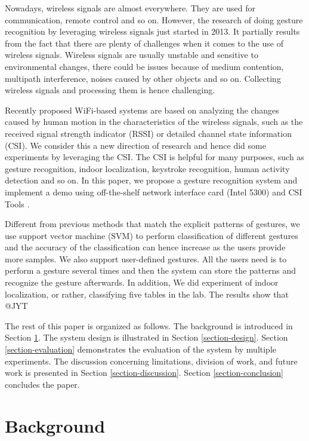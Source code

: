 \documentclass[conference]{IEEEtran}
\begin{document}
Nowadays, wireless signals are almost everywhere. They are used for communication, remote control and so on. However, the research of doing gesture recognition by leveraging wireless signals just started in 2013. It partially results from the fact that there are plenty of challenges when it comes to the use of wireless signals. 
Wireless signals are usually unstable and sensitive to environmental changes, there could be issues because of medium contention, multipath interference, noises caused by other objects and so on.
Collecting wireless signals and processing them is hence challenging.

Recently proposed WiFi-based systems are based on analyzing the changes caused by human motion in the characteristics of the wireless signals, such as the received signal strength indicator (RSSI) or detailed channel state information (CSI).
We consider this a new direction of research and hence did some experiments by leveraging the CSI.
The CSI is helpful for many purposes, such as gesture recognition, indoor localization, keystroke recognition, human activity detection and so on.
In this paper, we propose a gesture recognition system and implement a demo using off-the-shelf network interface card (Intel 5300) and CSI Tools \cite{halperin2011tool}. 

Different from previous methods that match the explicit patterns of gestures, we use support vector machine (SVM) to perform classification of different gestures and the accuracy of the classification can hence increase as the users provide more samples.
We also support user-defined gestures. All the users need is to perform a gesture several times and then the system can store the patterns and recognize the gesture afterwards.
In addition, We did experiment of indoor localization, or rather, classifying five tables in the lab.
The results show that @JYT

The rest of this paper is organized as follows.  The background is introduced in Section \ref{section-background}. The system design is illustrated in Section \ref{section-design}. Section \ref{section-evaluation} demonstrates the evaluation of the system by multiple experiments. The discussion concerning limitations, division of work, and future work is presented in Section \ref{section-discussion}. Section \ref{section-conclusion} concludes the paper.

\section{Background} \label{section-background}
\end{document}
